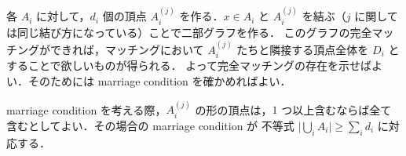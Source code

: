 \subsection{}
各 $A_i$ に対して，$d_i$ 個の頂点 $A_i^{(j)}$ を作る．$x\in A_i$ と  $A_i^{(j)}$ を結ぶ（$j$ に関しては同じ結び方になっている）ことで二部グラフを作る．
このグラフの完全マッチングができれば，マッチングにおいて $A_i^{(j)}$ たちと隣接する頂点全体を $D_i$ とすることで欲しいものが得られる．
よって完全マッチングの存在を示せばよい．そのためには marriage condition を確かめればよい．

marriage condition を考える際，$A_i^{(j)}$ の形の頂点は，$1$ つ以上含むならば全て含むとしてよい．その場合の marriage condition が
不等式 $\biggl\lvert \bigcup_{i} A_i\biggr\rvert \geq \sum_{i}d_i$ に対応する．
